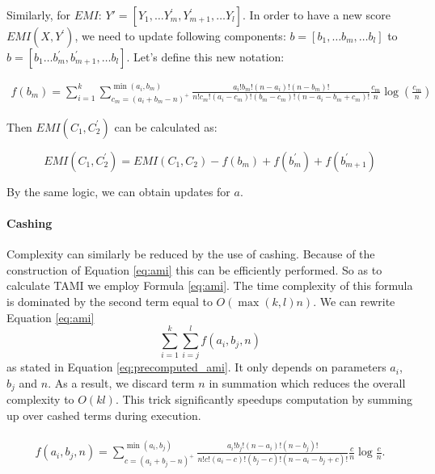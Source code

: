 Similarly, for $EMI$: $Y'=[Y_1, \dots Y_m^{'}, Y_{m+1}^{'}, \dots Y_{l}]$. In order to have a new score $EMI(X,Y^{'})$, we need to update following components: $b=[b_1, \dots b_m, \dots b_l]$ to $b=[b_1 \dots b_m^{'}, b_{m+1}^{'}, \dots b_l]$. Let's define this new notation:

\begin{equation}
\begin{split}
f(b_m) = \sum_{i=1}^{k}\sum_{c_{m}=(a_i+b_m-n)^+}^{\min(a_i, b_m)} 
\frac{a_i!b_m!(n-a_i)!(n-b_m)!}{n!c_{m}!(a_i-c_{m})!(b_m-c_{m})!(n-a_i-b_m+c_{m})!}\frac{c_{m}}{n}\log \left( \frac{ c_{m}}{n}\right)
\end{split}
\end{equation}

Then $EMI(C_1, C_2^{'})$ can be calculated as:

\begin{equation}
EMI(C_1, C_2^{'}) = EMI(C_1, C_2) - f(b_m) + f(b_m^{'}) + f(b_{m+1}^{'})
\end{equation}

By the same logic, we can obtain updates for $a$.

\paragraph{Cashing}
\label{cashing}
Complexity can similarly be reduced by the use of cashing. Because of the construction of Equation \ref{eq:ami} this can be efficiently performed. So as to calculate TAMI we employ Formula \ref{eq:ami}. The time complexity of this formula is dominated by the second term equal to $O(\max(k,l)n)$. We can rewrite Equation \ref{eq:ami} $$\sum_{i=1}^{k}\sum_{i=j}^{l}f(a_i,b_j,n)$$ as stated in Equation \ref{eq:precomputed_ami}. It only depends on parameters $a_i$, $b_j$ and $n$. As a result, we discard term $n$ in summation which reduces the overall complexity to $O(kl)$. This trick significantly speedups computation by summing up over cashed terms during execution.

\begin{align}\label{eq:precomputed_ami}
\begin{split}
f(a_i,b_j,n) =\sum_{c = (a_i+b_j - n)^+}^{\min(a_i, b_j)} \frac{a_i!b_j!(n-a_i)!(n-b_j)!}{n!c!(a_i-c)!(b_j-c)!(n-a_i-b_j+c)!}\frac {c}n \log \frac {c}n.
\end{split}
\end{align}